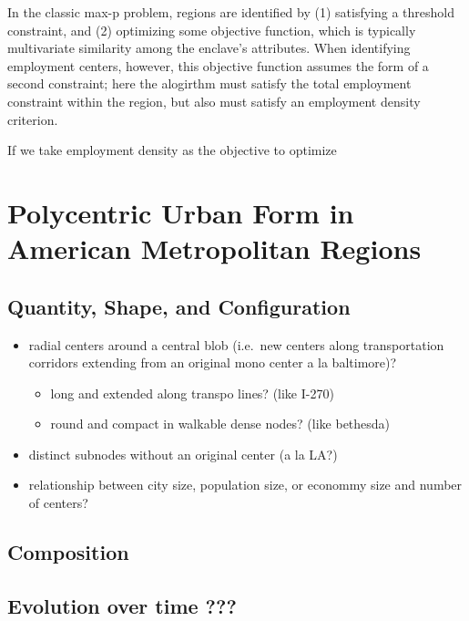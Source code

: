 \documentclass[11pt,article,oneside]{memoir}
\begin{document}
In the classic max-p problem, regions are identified by (1) satisfying a
threshold constraint, and (2) optimizing some objective function, which
is typically multivariate similarity among the enclave's attributes.
When identifying employment centers, however, this objective function
assumes the form of a second constraint; here the alogirthm must satisfy
the total employment constraint within the region, but also must satisfy
an employment density criterion.

If we take employment density as the objective to optimize

\hypertarget{polycentric-urban-form-in-american-metropolitan-regions}{%
\section{Polycentric Urban Form in American Metropolitan
Regions}\label{polycentric-urban-form-in-american-metropolitan-regions}}

\hypertarget{quantity-shape-and-configuration}{%
\subsection{Quantity, Shape, and
Configuration}\label{quantity-shape-and-configuration}}

\begin{itemize}
\item
  radial centers around a central blob (i.e.~new centers along
  transportation corridors extending from an original mono center a la
  baltimore)?

  \begin{itemize}
  \tightlist
  \item
    long and extended along transpo lines? (like I-270)
  \item
    round and compact in walkable dense nodes? (like bethesda)
  \end{itemize}
\item
  distinct subnodes without an original center (a la LA?)
\item
  relationship between city size, population size, or econommy size and
  number of centers?
\end{itemize}

\hypertarget{composition}{%
\subsection{Composition}\label{composition}}

\hypertarget{evolution-over-time}{%
\subsection{Evolution over time ???}\label{evolution-over-time}}
\end{document}
